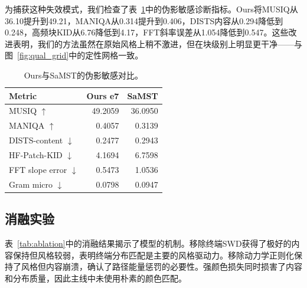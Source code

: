 ﻿\documentclass[letterpaper]{article}
\begin{document}
为捕获这种失效模式，我们检查了表~\ref{tab:artifact}中的伪影敏感诊断指标。Ours将MUSIQ从36.10提升到49.21，MANIQA从0.314提升到0.406，DISTS内容从0.294降低到0.248，高频块KID从6.76降低到4.17，FFT斜率误差从1.054降低到0.547。这些改进表明，我们的方法虽然在原始风格上稍不激进，但在块级别上明显更干净——与图~\ref{fig:qual_grid}中的定性网格一致。

\begin{table}[t]
\centering
\caption{Ours与SaMST的伪影敏感对比。}
\label{tab:artifact}
\begin{tabular}{lrr}
\toprule
Metric & Ours e7 & SaMST \\
\midrule
MUSIQ $\uparrow$ & 49.2059 & 36.0950 \\
MANIQA $\uparrow$ & 0.4057 & 0.3139 \\
DISTS-content $\downarrow$ & 0.2477 & 0.2943 \\
HF-Patch-KID $\downarrow$ & 4.1694 & 6.7598 \\
FFT slope error $\downarrow$ & 0.5473 & 1.0536 \\
Gram micro $\downarrow$ & 0.0798 & 0.0947 \\
\bottomrule
\end{tabular}
\end{table}

\subsection{消融实验}
\begin{table}[t]
\centering
\caption{严格750协议下的消融实验。}
\label{tab:ablation}
\end{table}

表~\ref{tab:ablation}中的消融结果揭示了模型的机制。移除终端SWD获得了极好的内容保持但风格较弱，表明终端分布匹配是主要的风格驱动力。移除动力学正则化保持了风格但内容崩溃，确认了路径能量惩罚的必要性。强颜色损失同时损害了内容和分布质量，因此主线中未使用朴素的颜色匹配。
\end{document}
